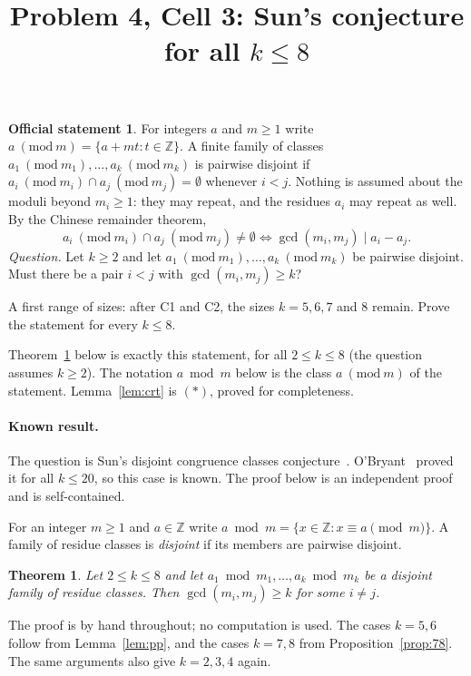 \documentclass[11pt]{article}
\title{Problem 4, Cell 3: Sun's conjecture for all $k\le 8$}
\author{}
\date{}
\newtheorem{theorem}{Theorem}
\theoremstyle{remark}
\theoremstyle{definition}
\newtheorem*{statement}{Official statement}
\begin{document}
\maketitle

\begin{statement}
For integers $a$ and $m\ge1$ write $a\ (\mathrm{mod}\ m)=\{a+mt:t\in\mathbb{Z}\}$. A finite family
of classes $a_1\ (\mathrm{mod}\ m_1),\dots,a_k\ (\mathrm{mod}\ m_k)$ is pairwise disjoint if
$a_i\ (\mathrm{mod}\ m_i)\cap a_j\ (\mathrm{mod}\ m_j)=\emptyset$ whenever $i<j$. Nothing is assumed
about the moduli beyond $m_i\ge1$: they may repeat, and the residues $a_i$ may repeat as well. By the
Chinese remainder theorem,
\[
  a_i\ (\mathrm{mod}\ m_i)\cap a_j\ (\mathrm{mod}\ m_j)\neq\emptyset\iff\gcd(m_i,m_j)\mid a_i-a_j.\tag{$*$}
\]
\emph{Question.} Let $k\ge2$ and let $a_1\ (\mathrm{mod}\ m_1),\dots,a_k\ (\mathrm{mod}\ m_k)$ be
pairwise disjoint. Must there be a pair $i<j$ with $\gcd(m_i,m_j)\ge k$?

A first range of sizes: after C1 and C2, the sizes $k=5,6,7$ and $8$ remain. Prove the statement
for every $k\le8$.
\end{statement}

\noindent Theorem~\ref{thm:main} below is exactly this statement, for all $2\le k\le8$ (the question assumes
$k\ge2$). The notation $a\bmod m$ below is the class $a\ (\mathrm{mod}\ m)$ of the statement.
Lemma~\ref{lem:crt} is $(*)$, proved for completeness.

\paragraph{Known result.} The question is Sun's disjoint congruence classes conjecture~\cite{Sun06}.
O'Bryant~\cite{OBr07} proved it for all $k\le20$, so this case is known. The proof below is an
independent proof and is self-contained.

For an integer $m\ge1$ and $a\in\mathbb{Z}$ write $a\bmod m=\{x\in\mathbb{Z}:x\equiv a\pmod m\}$.
A family of residue classes is \emph{disjoint} if its members are pairwise disjoint.

\begin{theorem}\label{thm:main}
Let $2\le k\le 8$ and let $a_1\bmod m_1,\dots,a_k\bmod m_k$ be a disjoint family of residue
classes. Then $\gcd(m_i,m_j)\ge k$ for some $i\ne j$.
\end{theorem}

The proof is by hand throughout; no computation is used. The cases $k=5,6$ follow from
Lemma~\ref{lem:pp}, and the cases $k=7,8$ from Proposition~\ref{prop:78}. The same arguments
also give $k=2,3,4$ again.
\end{document}
